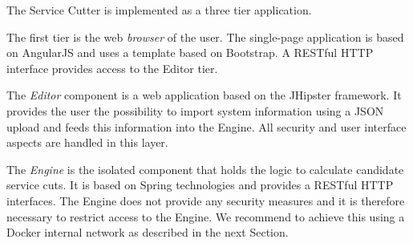 \begin{minipage}[t]{0.5\textwidth}
\setlength{\parskip}{5pt plus 0.1pt}
	The Service Cutter is implemented as a three tier application.
	
	The first tier is the web \textit{browser} of the user. The single-page application is based on AngularJS\cite{angularjs} and uses a template based on Bootstrap\cite{bootstrap}. A RESTful HTTP interface provides access to the Editor tier.
	
	The \textit{Editor} component is a web application based on the JHipster\cite{jhipster} framework. It provides the user the possibility to import system information using a JSON upload and feeds this information into the Engine. All security and user interface aspects are handled in this layer.
	
	The \textit{Engine} is the isolated component that holds the logic to calculate candidate service cuts. It is based on Spring technologies and provides a RESTful HTTP interfaces. The Engine does not provide any security measures and it is therefore necessary to restrict access to the Engine. We recommend to achieve this using a Docker\cite{docker} internal network as described in the next Section.
	
	
\end{minipage}
